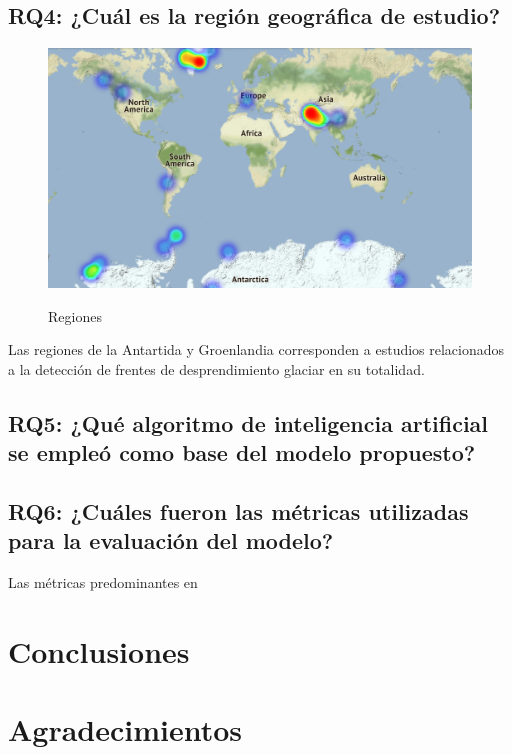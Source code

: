 \documentclass{article}
\begin{document}
\subsection{RQ4: ¿Cuál es la región geográfica de estudio?}

\begin{figure}[H]
    \centering
    \includegraphics[width=1\textwidth]{images/fr_regions.png}
    \label{fig:picoc}
    \caption{Regiones}
\end{figure}

Las regiones de la Antartida y Groenlandia corresponden a estudios relacionados a la detección de frentes de desprendimiento glaciar en su totalidad.

\subsection{RQ5: ¿Qué algoritmo de inteligencia artificial se empleó como base del modelo propuesto?}


\subsection{RQ6: ¿Cuáles fueron las métricas utilizadas para la evaluación del modelo?}

Las métricas predominantes en

\section{Conclusiones}

\section{Agradecimientos}



\end{document}
